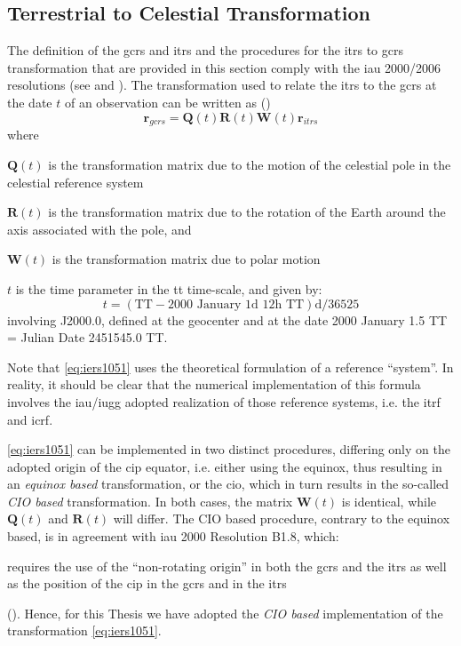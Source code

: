 \subsection{Terrestrial to Celestial Transformation}\label{ssec:itrs-to-gcrs}

The definition of the \gls{gcrs} and \gls{itrs} and the procedures for the \gls{itrs} 
to \gls{gcrs} transformation that are provided in this section comply with the 
\gls{iau} 2000/2006 resolutions (see \cite{Capitaine2006} and \cite{iauWGnfa}). 
The transformation used to relate the \gls{itrs} to the \gls{gcrs} at the date $t$ 
of an observation can be written as (\cite{iers2010})
\begin{equation}\label{eq:iers1051}
    \bm{r}_{gcrs} = \bm{Q}(t) \bm{R}(t) \bm{W}(t) \bm{r}_{itrs}
\end{equation}
where
\begin{description}
    \item $\bm{Q}(t)$ is the transformation matrix due to the motion of 
        the celestial pole in the celestial reference system 
    \item $\bm{R}(t)$ is the transformation matrix due to the rotation 
        of the Earth around the axis associated with the pole, and
    \item $\bm{W}(t)$ is the transformation matrix due to polar motion
    \item $t$ is the time parameter in the \gls{tt} time-scale, and given by:
    \begin{equation}
        t = (\text{TT} - \text{2000 January 1d 12h TT}) \si{\day} / 36525
    \end{equation}
    involving J2000.0, defined at the geocenter and at the date 2000 January 1.5 TT 
    = Julian Date 2451545.0 TT.
\end{description}
Note that \ref{eq:iers1051} uses the theoretical formulation of a reference ``system''. 
In reality, it should be clear that the numerical implementation of this formula 
involves the \gls{iau}/\gls{iugg} adopted realization of those reference systems, i.e. 
the \gls{itrf} and \gls{icrf}.

\ref{eq:iers1051} can be implemented in two distinct procedures, differing only on the 
adopted origin of the \gls{cip} equator, i.e. either using the equinox, thus resulting 
in an \emph{equinox based} transformation, or the \gls{cio}, which in turn results in 
the so-called \emph{CIO based} transformation. In both cases, the matrix $\bm{W}(t)$ is 
identical, while $\bm{Q}(t)$ and $\bm{R}(t)$ will differ. The CIO based
procedure, contrary to the equinox based, is in agreement with \gls{iau} 2000 Resolution B1.8, 
which:
\begin{displayquote}
requires the use of the ``non-rotating origin'' in both the \gls{gcrs} and the 
\gls{itrs} as well as the position of the \gls{cip} in the \gls{gcrs} and in the 
\gls{itrs} 
\end{displayquote}
(\cite{iers2010}). Hence, for this Thesis we have adopted the \emph{CIO based} 
implementation of the transformation \ref{eq:iers1051}.


